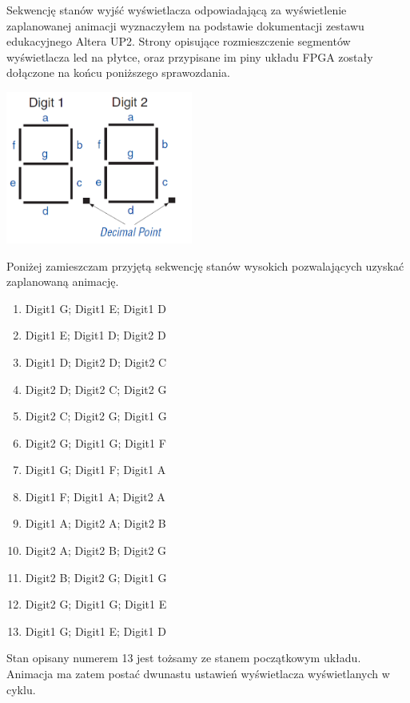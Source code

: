 \documentclass{article}
\begin{document}
        Sekwencję stanów wyjść wyświetlacza odpowiadającą za wyświetlenie zaplanowanej animacji wyznaczyłem na podstawie dokumentacji zestawu edukacyjnego Altera UP2. Strony opisujące rozmieszczenie segmentów wyświetlacza led na płytce, oraz przypisane im piny układu FPGA zostały dołączone na końcu poniższego sprawozdania.
        \begin{center}
            \includegraphics[height=5cm]{reports/img/7seg.png}\\
        \end{center}
        Poniżej zamieszczam przyjętą sekwencję stanów wysokich pozwalających uzyskać zaplanowaną animację.
        \begin{enumerate}
            \item Digit1 G; Digit1 E; Digit1 D
            \item Digit1 E; Digit1 D; Digit2 D
            \item Digit1 D; Digit2 D; Digit2 C
            \item Digit2 D; Digit2 C; Digit2 G
            \item Digit2 C; Digit2 G; Digit1 G
            \item Digit2 G; Digit1 G; Digit1 F
            \item Digit1 G; Digit1 F; Digit1 A
            \item Digit1 F; Digit1 A; Digit2 A
            \item Digit1 A; Digit2 A; Digit2 B
            \item Digit2 A; Digit2 B; Digit2 G
            \item Digit2 B; Digit2 G; Digit1 G
            \item Digit2 G; Digit1 G; Digit1 E
            \item Digit1 G; Digit1 E; Digit1 D
        \end{enumerate}
        Stan opisany numerem 13 jest tożsamy ze stanem początkowym układu. Animacja ma zatem postać dwunastu ustawień wyświetlacza wyświetlanych w cyklu. 
    
\end{document}
